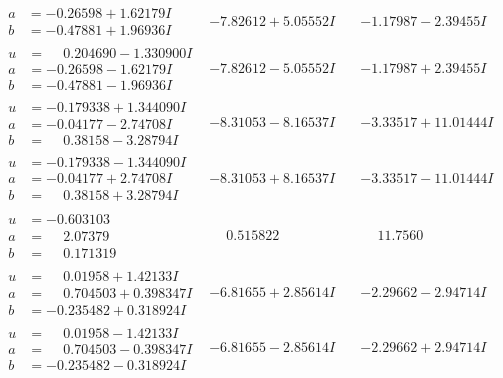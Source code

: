 \documentclass[1p]{elsarticle_modified}
\theoremstyle{definition}
\begin{document}
$$\begin{array}{c|c|c}
\begin{aligned}
a &= -0.26598 + 1.62179 I \\
b &= -0.47881 + 1.96936 I\end{aligned}
 & -7.82612 + 5.05552 I & -1.17987 - 2.39455 I \\ \hline\begin{aligned}
u &= \phantom{-}0.204690 - 1.330900 I \\
a &= -0.26598 - 1.62179 I \\
b &= -0.47881 - 1.96936 I\end{aligned}
 & -7.82612 - 5.05552 I & -1.17987 + 2.39455 I \\ \hline\begin{aligned}
u &= -0.179338 + 1.344090 I \\
a &= -0.04177 - 2.74708 I \\
b &= \phantom{-}0.38158 - 3.28794 I\end{aligned}
 & -8.31053 - 8.16537 I & -3.33517 + 11.01444 I \\ \hline\begin{aligned}
u &= -0.179338 - 1.344090 I \\
a &= -0.04177 + 2.74708 I \\
b &= \phantom{-}0.38158 + 3.28794 I\end{aligned}
 & -8.31053 + 8.16537 I & -3.33517 - 11.01444 I \\ \hline\begin{aligned}
u &= -0.603103\phantom{ +0.000000I} \\
a &= \phantom{-}2.07379\phantom{ +0.000000I} \\
b &= \phantom{-}0.171319\phantom{ +0.000000I}\end{aligned}
 & \phantom{-}0.515822\phantom{ +0.000000I} & \phantom{-}11.7560\phantom{ +0.000000I} \\ \hline\begin{aligned}
u &= \phantom{-}0.01958 + 1.42133 I \\
a &= \phantom{-}0.704503 + 0.398347 I \\
b &= -0.235482 + 0.318924 I\end{aligned}
 & -6.81655 + 2.85614 I & -2.29662 - 2.94714 I \\ \hline\begin{aligned}
u &= \phantom{-}0.01958 - 1.42133 I \\
a &= \phantom{-}0.704503 - 0.398347 I \\
b &= -0.235482 - 0.318924 I\end{aligned}
 & -6.81655 - 2.85614 I & -2.29662 + 2.94714 I \\ \hline\begin{aligned}

\end{aligned}
\end{array}$$
\end{document}
